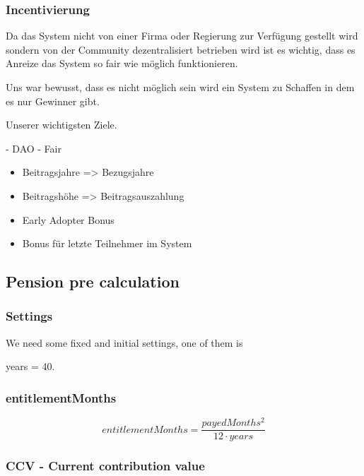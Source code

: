 \subsubsection{Incentivierung}

Da das System nicht von einer Firma oder Regierung zur Verfügung gestellt wird sondern von der Community dezentralisiert betrieben wird ist es wichtig, dass es Anreize das System so fair wie möglich funktionieren.

Uns war bewusst, dass es nicht möglich sein wird ein System zu Schaffen in dem es nur Gewinner gibt.

Unserer wichtigsten Ziele.

- DAO
- Fair



\begin{itemize}
\item Beitragsjahre => Bezugsjahre
\item Beitragshöhe => Beitragsauszahlung
\item Early Adopter Bonus
\item Bonus für letzte Teilnehmer im System
\end{itemize}


\newpage

\subsection{Pension pre calculation}

\subsubsection*{Settings}

We need some fixed and initial settings,
one of them is 

years = 40.

\subsubsection*{entitlementMonths}

\begin{equation*}
	entitlementMonths = \frac{payedMonths^2}{12 \cdot years}
\end{equation*}

\subsubsection*{CCV - Current contribution value}

